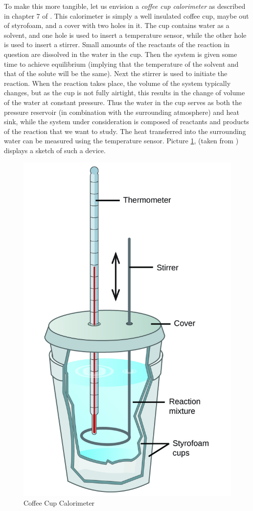 \documentclass[a4paper, draft]{article}
\theoremstyle{own}
\theoremstyle{remark}
\begin{document}
To make this more tangible, let us envision a {\em coffee cup calorimeter} as described in chapter 7 of \cite{Petrucci}. This calorimeter is simply a well insulated coffee cup, maybe out of styrofoam, and a cover with two holes in it. The cup contains water as a solvent, and one hole is used to insert a temperature sensor, while the other hole is used to insert a stirrer. Small amounts of the reactants of the reaction in question are dissolved in the water in the cup. Then the system is given some time to achieve equilibrium (implying that the temperature of the solvent and that of the solute will be the same). Next the stirrer is used to initiate the reaction. When the reaction takes place, the volume of the system typically changes, but as the cup is not fully airtight, this results in the change of volume of the water at constant pressure. Thus the water in the cup serves as both the pressure reservoir (in combination with the surrounding atmosphere) and heat sink, while the system under consideration is composed of reactants and products of the reaction that we want to study. The heat transferred into the surrounding water can be measured using the temperature sensor. Picture \ref{fig:coffeecupcalorimeter}, (taken from \cite{openstax} ) displays a sketch of such a device.

\begin{figure}
	\centering
	\includegraphics[width=0.2\linewidth]{CoffeeCupCalorimeter}
	\caption[Coffee Cup Calorimeter]{Coffee Cup Calorimeter}
	\label{fig:coffeecupcalorimeter}
\end{figure}
\end{document}
